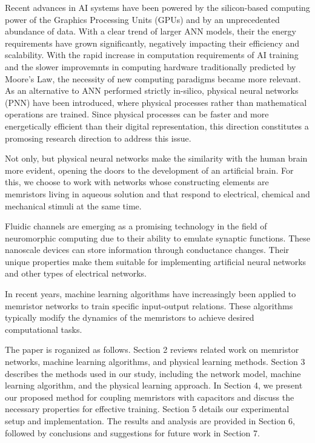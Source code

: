 \documentclass[reprint,superscriptaddress,prb,showkeys]{revtex4-2}
\begin{document}
Recent advances in AI systems have been powered by the silicon-based computing power of the Graphics Processing Units (GPUs) and by an unprecedented abundance of data. With a clear trend of larger ANN models, their the energy requirements have grown significantly, negatively impacting their efficiency and scalability\cite{energy_cost_ml1, energy_cost_ml2}. With the rapid increase in computation requirements of AI training and the slower improvemnts in computing hardware traditionally predicted by Moore's Law, the necessity of new computing paradigms became more relevant.  As an alternative to ANN performed strictly in-silico, physical neural networks (PNN) have been introduced, where physical processes rather than mathematical operations are trained\cite{trainingphysicalneuralnetworks}. Since physical processes can be faster and more energetically efficient than their digital representation, this direction constitutes a promosing research direction to address this issue.





Not only, but physical neural networks make the similarity with the human brain more evident, opening the doors to the development of an artificial brain. For this, we choose to work with networks whose constructing elements are memristors living in aqueous solution and that respond to electrical, chemical and mechanical stimuli at the same time.

Fluidic channels are emerging as a promising technology in the field of neuromorphic computing due to their ability to emulate synaptic functions. These nanoscale devices can store information through conductance changes. Their unique properties make them suitable for implementing artificial neural networks and other types of electrical networks.

In recent years, machine learning algorithms have increasingly been applied to memristor networks to train specific input-output relations. These algorithms typically modify the dynamics of the memristors to achieve desired computational tasks.



The paper is roganized as follows. Section 2 reviews related work on memristor networks, machine learning algorithms, and physical learning methods. Section 3 describes the methods used in our study, including the network model, machine learning algorithm, and the physical learning approach. In Section 4, we present our proposed method for coupling memristors with capacitors and discuss the necessary properties for effective training. Section 5 details our experimental setup and implementation. The results and analysis are provided in Section 6, followed by conclusions and suggestions for future work in Section 7.
\end{document}
